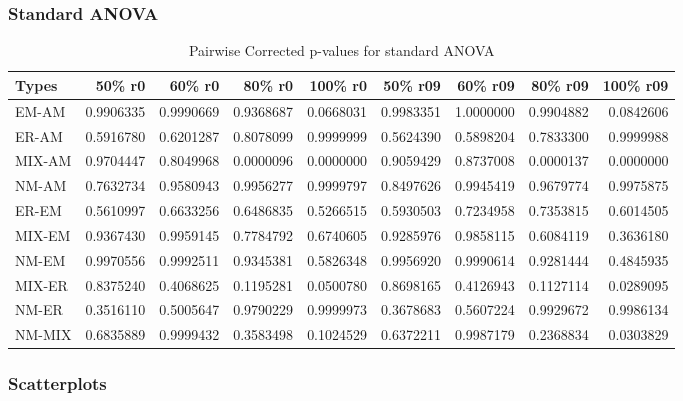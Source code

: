 \documentclass[]{article}
\begin{document}
\hypertarget{standard-anova-7}{%
\subsubsection{Standard ANOVA}\label{standard-anova-7}}

\begin{table}[H]

\caption{\label{tab:unnamed-chunk-43}Pairwise Corrected p-values for standard ANOVA}
\centering
\begin{tabular}{l|r|r|r|r|r|r|r|r}
\hline
Types & 50\% r0 & 60\% r0 & 80\% r0 & 100\% r0 & 50\% r09 & 60\% r09 & 80\% r09 & 100\% r09\\
\hline
EM-AM & 0.9906335 & 0.9990669 & 0.9368687 & 0.0668031 & 0.9983351 & 1.0000000 & 0.9904882 & 0.0842606\\
\hline
ER-AM & 0.5916780 & 0.6201287 & 0.8078099 & 0.9999999 & 0.5624390 & 0.5898204 & 0.7833300 & 0.9999988\\
\hline
MIX-AM & 0.9704447 & 0.8049968 & 0.0000096 & 0.0000000 & 0.9059429 & 0.8737008 & 0.0000137 & 0.0000000\\
\hline
NM-AM & 0.7632734 & 0.9580943 & 0.9956277 & 0.9999797 & 0.8497626 & 0.9945419 & 0.9679774 & 0.9975875\\
\hline
ER-EM & 0.5610997 & 0.6633256 & 0.6486835 & 0.5266515 & 0.5930503 & 0.7234958 & 0.7353815 & 0.6014505\\
\hline
MIX-EM & 0.9367430 & 0.9959145 & 0.7784792 & 0.6740605 & 0.9285976 & 0.9858115 & 0.6084119 & 0.3636180\\
\hline
NM-EM & 0.9970556 & 0.9992511 & 0.9345381 & 0.5826348 & 0.9956920 & 0.9990614 & 0.9281444 & 0.4845935\\
\hline
MIX-ER & 0.8375240 & 0.4068625 & 0.1195281 & 0.0500780 & 0.8698165 & 0.4126943 & 0.1127114 & 0.0289095\\
\hline
NM-ER & 0.3516110 & 0.5005647 & 0.9790229 & 0.9999973 & 0.3678683 & 0.5607224 & 0.9929672 & 0.9986134\\
\hline
NM-MIX & 0.6835889 & 0.9999432 & 0.3583498 & 0.1024529 & 0.6372211 & 0.9987179 & 0.2368834 & 0.0303829\\
\hline
\end{tabular}
\end{table}

\hypertarget{scatterplots-2}{%
\subsubsection{Scatterplots}\label{scatterplots-2}}
\end{document}
